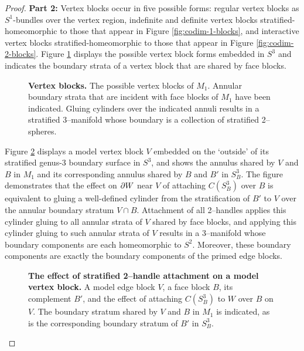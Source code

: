\begin{proof}
	\textbf{Part 2:}	
	Vertex blocks occur in five possible forms: regular vertex blocks as $S^1$-bundles over the vertex region, indefinite and definite vertex blocks stratified-homeomorphic to those that appear in Figure \ref{fig:codim-1-blocks}, and interactive vertex blocks stratified-homeomorphic to those that appear in Figure \ref{fig:codim-2-blocks}.
	Figure \ref{fig:vertex-block-incidence} displays the possible vertex block forms embedded in $S^3$ and indicates the boundary strata of a vertex block that are shared by face blocks.
	
	\begin{figure}[h!]
		\caption{
			\textbf{Vertex blocks.}
			The possible vertex blocks of $M_1$.
			Annular boundary strata that are incident with face blocks of $M_1$ have been indicated.
			Gluing cylinders over the indicated annuli results in a stratified 3--manifold whose boundary is a collection of stratified 2--spheres.
		}
		\label{fig:vertex-block-incidence}
	\end{figure}	
	
	Figure \ref{fig:vertex-face-shared-boundary} displays a model vertex block $V$ embedded on the `outside' of its stratified genus-3 boundary surface in $S^3$, and shows the annulus shared by $V$ and $B$ in $M_1$ and its corresponding annulus shared by $B$ and $B'$ in $S_B^3$.
	The figure demonstrates that the effect on $\partial W$ near $V$ of attaching $C(S_B^3)$ over $B$ is equivalent to gluing a well-defined cylinder from the stratification of $B'$  to $V$ over the annular boundary stratum $V\cap B$.
	Attachment of all 2--handles applies this cylinder gluing to all annular strata of $V$ shared by face blocks, and applying this cylinder gluing to such annular strata of $V$ results in a 3--manifold whose boundary components are each homeomorphic to $S^2$.
	Moreover, these boundary components are exactly the boundary components of the primed edge blocks.
	
	\begin{figure}[h!]
		\caption{
			\textbf{The effect of stratified 2--handle attachment on a model vertex block.}
			A model edge block $V$, a face block $B$, its complement $B'$, and the effect of attaching $C(S_B^3)$ to $W$ over $B$ on $V$.
			The boundary stratum shared by $V$ and $B$ in $M_1$ is indicated, as is the corresponding boundary stratum of $B'$ in $S_B^3$.
		}
		\label{fig:vertex-face-shared-boundary}
	\end{figure}


\end{proof}
